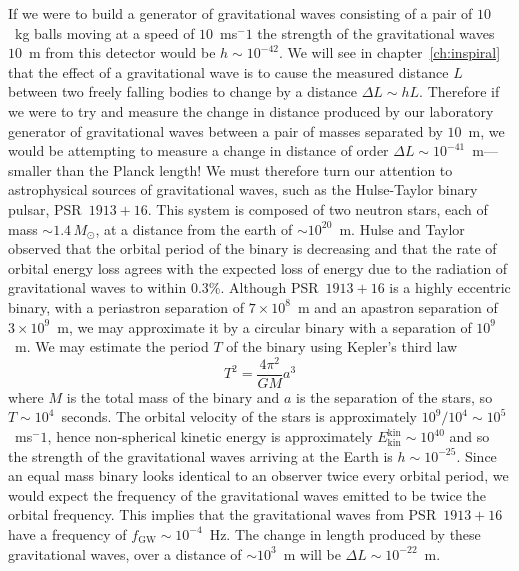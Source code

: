 If we were to build a generator of gravitational waves consisting of a pair of
$10$~kg balls moving at a speed of $10$~ms$^-1$ the strength of the
gravitational waves $10$~m from this detector would be $h \sim 10^{-42}$.  We
will see in chapter~\ref{ch:inspiral} that the effect of a gravitational wave
is to cause the measured distance $L$ between two freely falling bodies to
change by a distance $\Delta L \sim h L$. Therefore if we were to try and
measure the change in distance produced by our laboratory generator of
gravitational waves between a pair of masses separated by $10$~m, we would be
attempting to measure a change in distance of order $\Delta L \sim
10^{-41}$~m---smaller than the Planck length!  We must therefore turn our
attention to astrophysical sources of gravitational waves, such as the
Hulse-Taylor binary pulsar, PSR~$1913+16$\cite{1975ApJ...195L..51H}. This
system is composed of two neutron stars, each of mass $\sim 1.4\,M_\odot$,
at a distance from the earth of $\sim 10^{20}$~m. Hulse and Taylor observed
that the orbital period of the binary is decreasing and that the rate of
orbital energy loss agrees with the expected loss of energy due to the
radiation of gravitational waves to within
$0.3\%$\cite{Taylor:1982,Taylor:1989}. Although PSR~$1913+16$ is a highly
eccentric binary, with a periastron separation of $7\times10^{8}$~m and an
apastron separation of $3\times10^{9}$~m, we may approximate it by a circular
binary with a separation of $10^{9}$~m. We may estimate the period $T$ of the
binary using Kepler's third law
\begin{equation}
T^2 = \frac{4\pi^2}{GM}a^3
\end{equation}
where $M$ is the total mass of the binary and $a$ is the separation of the
stars, so $T\sim 10^4$~seconds. The orbital velocity of the stars is
approximately $10^9 / 10^4 \sim 10^5$~ms$^-1$, hence non-spherical kinetic
energy is approximately $E^\mathrm{kin}_\mathrm{kin} \sim 10^{40}$ and so the
strength of the gravitational waves arriving at the Earth is $h \sim
10^{-25}$. Since an equal mass binary looks identical to an observer twice
every orbital period, we would expect the frequency of the gravitational waves
emitted to be twice the orbital frequency. This implies that the gravitational
waves from PSR~$1913+16$ have a frequency of $f_\mathrm{GW} \sim 10^{-4}$~Hz.
The change in length produced by these gravitational waves, over a distance of
$\sim 10^3$~m will be $\Delta L \sim 10^{-22}$~m.

